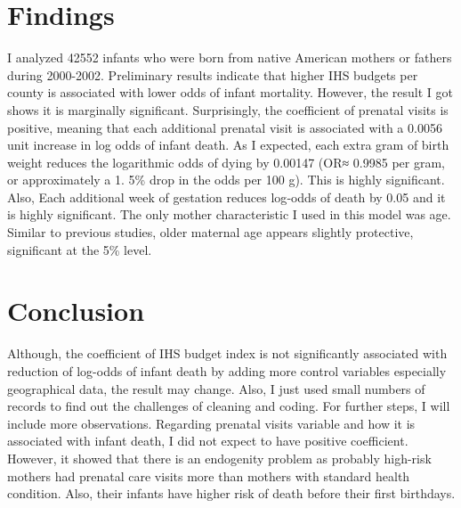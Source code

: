 \documentclass{article}
\begin{document}
\section{Findings}
I analyzed 42552 infants who were born from native American mothers or fathers during 2000-2002. Preliminary results indicate that higher IHS budgets per county is associated with lower odds of infant mortality. However, the result I got shows it is marginally significant. Surprisingly, the coefficient of prenatal visits is positive, meaning that each additional prenatal visit is associated with a 0.0056 unit increase in log odds of infant death. As I expected, each extra gram of birth weight reduces the logarithmic odds of dying by 0.00147 (OR≈ 0.9985 per gram, or approximately a 1. 5\% drop in the odds per 100 g). This is highly significant. Also, Each additional week of gestation reduces log‐odds of death by 0.05 and it is highly significant. The only mother characteristic I used in this model was age. Similar to previous studies, older maternal age appears slightly protective, significant at the 5\% level.

\section{Conclusion}
Although, the coefficient of IHS budget index is not significantly associated with reduction of log-odds of infant death by adding more control variables especially geographical data, the result may change. Also, I just used small numbers of records to find out the challenges of cleaning and coding. For further steps, I will include more observations.  
Regarding prenatal visits variable and how it is associated with infant death, I did not expect to have positive coefficient. However, it showed that there is an endogenity problem as probably high-risk mothers had prenatal care visits more than mothers with standard health condition. Also, their infants have higher risk of death before their first birthdays. 

\newpage
\end{document}
